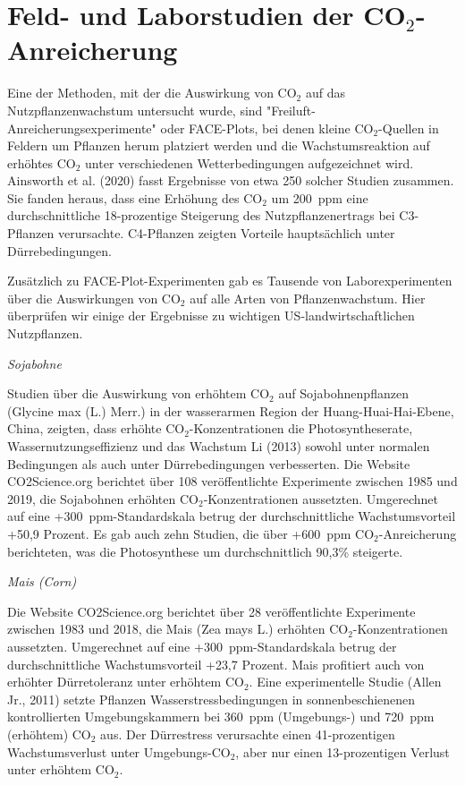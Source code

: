 \documentclass[12pt,paper=a4,DIV=12,parskip=never,chapterprefix=false,headings=standardclasses]{scrreprt}
\begin{document}
\section{Feld- und Laborstudien der CO$_2$-Anreicherung}
Eine der Methoden, mit der die Auswirkung von CO$_2$ auf das Nutzpflanzenwachstum untersucht wurde, sind "Freiluft-Anreicherungsexperimente" oder FACE-Plots, bei denen kleine CO$_2$-Quellen in Feldern um Pflanzen herum platziert werden und die Wachstumsreaktion auf erhöhtes CO$_2$ unter verschiedenen Wetterbedingungen aufgezeichnet wird. Ainsworth et al. (2020) fasst Ergebnisse von etwa 250 solcher Studien zusammen. Sie fanden heraus, dass eine Erhöhung des CO$_2$ um \SI{200}{ppm} eine durchschnittliche 18-prozentige Steigerung des Nutzpflanzenertrags bei C3-Pflanzen verursachte. C4-Pflanzen zeigten Vorteile hauptsächlich unter Dürrebedingungen.

Zusätzlich zu FACE-Plot-Experimenten gab es Tausende von Laborexperimenten über die Auswirkungen von CO$_2$ auf alle Arten von Pflanzenwachstum. Hier überprüfen wir einige der Ergebnisse zu wichtigen US-landwirtschaftlichen Nutzpflanzen.

\emph{Sojabohne}

Studien über die Auswirkung von erhöhtem CO$_2$ auf Sojabohnenpflanzen (Glycine max (L.) Merr.) in der wasserarmen Region der Huang-Huai-Hai-Ebene, China, zeigten, dass erhöhte CO$_2$-Konzentrationen die Photosyntheserate, Wassernutzungseffizienz und das Wachstum Li (2013) sowohl unter normalen Bedingungen als auch unter Dürrebedingungen verbesserten. Die Website CO2Science.org berichtet über 108 veröffentlichte Experimente zwischen 1985 und 2019, die Sojabohnen erhöhten CO$_2$-Konzentrationen aussetzten. Umgerechnet auf eine +\SI{300}{ppm}-Standardskala betrug der durchschnittliche Wachstumsvorteil +50,9 Prozent. Es gab auch zehn Studien, die über +\SI{600}{ppm} CO$_2$-Anreicherung berichteten, was die Photosynthese um durchschnittlich 90,3\% steigerte.

\emph{Mais (Corn)}

Die Website CO2Science.org berichtet über 28 veröffentlichte Experimente zwischen 1983 und 2018, die Mais (Zea mays L.) erhöhten CO$_2$-Konzentrationen aussetzten. Umgerechnet auf eine +\SI{300}{ppm}-Standardskala betrug der durchschnittliche Wachstumsvorteil +23,7 Prozent. Mais profitiert auch von erhöhter Dürretoleranz unter erhöhtem CO$_2$. Eine experimentelle Studie (Allen Jr., 2011) setzte Pflanzen Wasserstressbedingungen in sonnenbeschienenen kontrollierten Umgebungskammern bei \SI{360}{ppm} (Umgebungs-) und \SI{720}{ppm} (erhöhtem) CO$_2$ aus. Der Dürrestress verursachte einen 41-prozentigen Wachstumsverlust unter Umgebungs-CO$_2$, aber nur einen 13-prozentigen Verlust unter erhöhtem CO$_2$.
\end{document}
